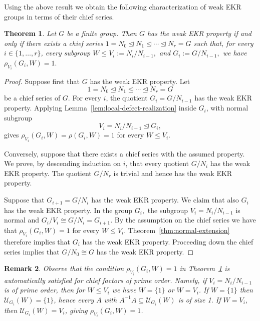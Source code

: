 \documentclass[11pt]{article}
\newtheorem{theorem}{Theorem}[section]
\newtheorem{remark}[theorem]{Remark}
\begin{document}
Using the above result we obtain the following characterization of weak EKR groups in terms of their chief series.


\begin{theorem} \label{thm:chief-series-characterization}
Let \(G\) be a finite group. 
Then \(G\) has the weak EKR property if and only if there exists a chief series 
\( 1=N_0\trianglelefteq N_1\trianglelefteq\cdots \trianglelefteq N_r=G \) 
such that, for every \(i\in\{1,\ldots,r\}\), every subgroup \( W\leq V_i:=N_i/N_{i-1}, \) and \( G_i:=G/N_{i-1}, \) we have \( \rho_{V_i}(G_i,W)=1. 
\label{eq:chief-local-condition} \) 
\end{theorem} 
\begin{proof} 
Suppose first that \(G\) has the weak EKR property. 
Let \[ 1=N_0\trianglelefteq N_1\trianglelefteq\cdots \trianglelefteq N_r=G \] be a chief series of $G$. 
For every \(i\), the quotient  $G_i=G/N_{i-1}$  has the weak EKR property. 
Applying Lemma~\ref{lem:local-defect-realization} inside \(G_i\), with normal subgroup \[ V_i=N_i/N_{i-1}\trianglelefteq G_i, \] gives \( \rho_{V_i}(G_i,W) = \rho(G_i,W) = 1 \) for every \(W\leq V_i\). 

Conversely, suppose that there exists a chief series with the assumed property. 
We prove, by descending induction on \(i\), that every quotient \(G/N_i\) has the weak EKR property. 
The quotient \(G/N_r\) is trivial and hence has the weak EKR property. 

Suppose that \(G_{i+1}=G/N_{i}\) has the weak EKR property. We claim that also $G_i$ has the weak EKR property. 
In the group \( G_{i}, \) the subgroup \( V_{i}=N_{i}/N_{i-1} \) is normal and \( G_{i}/V_{i}\cong G/N_i=G_{i+1}. \) 
By the assumption on the chief series we have that 
\( \rho_{V_i}(G_i,W)=1 \) for every $W\leq V_i$.
Theorem~\ref{thm:normal-extension} therefore implies that \(G_i\) has the weak EKR property. 
Proceeding down the chief series implies that \( G/N_0\cong G \) has the weak EKR property. 
\end{proof} 

\begin{remark}
Observe that the condition $\rho_{V_i}(G_i,W)=1$ in Theorem~\ref{thm:chief-series-characterization} is automatically satisfied for chief factors of prime order. 
Namely, if $V_i=N_i/N_{i-1}$ is of prime order, then for $W\leq V_i$ we have $W=\{1\}$ or $W=V_i$.  If $W=\{1\}$ then $\mathcal{U}_{G_i}(W)=\{1\}$, hence every $A$ with $A^{-1}A\subseteq \mathcal{U}_{G_i}(W)$ is of size 1. If $W=V_i$, then $\mathcal{U}_{G_i}(W)=V_i$, giving $\rho_{V_i}(G_i,W)=1$.
\end{remark}
\end{document}
